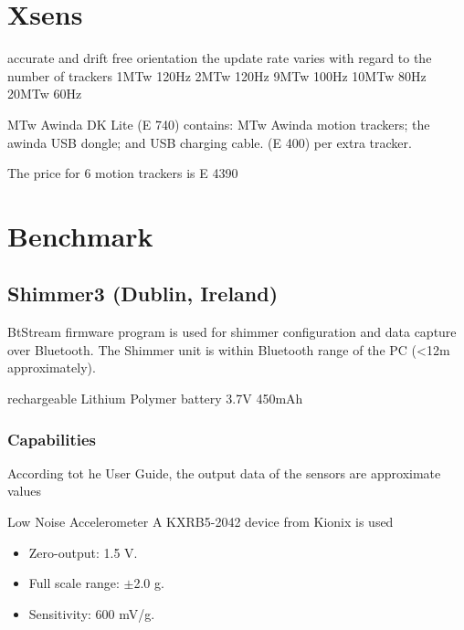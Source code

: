 \section{Xsens}


accurate and drift free orientation
the update rate varies with regard to the number of trackers
1MTw 120Hz
2MTw 120Hz
9MTw 100Hz
10MTw 80Hz
20MTw 60Hz

MTw Awinda DK Lite (E 740) contains:
MTw Awinda motion trackers; the awinda USB dongle; and USB charging cable.
(E 400) per extra tracker.

The price for 6 motion trackers is E 4390






\section*{Benchmark}

\subsection*{Shimmer3 (Dublin, Ireland)}


BtStream firmware program is used for shimmer configuration
and data capture over Bluetooth.
The Shimmer unit is within Bluetooth range of the PC (<12m approximately).

rechargeable Lithium Polymer battery 3.7V 450mAh

\subsubsection*{Capabilities}
According tot he User Guide, the output data of the sensors are
approximate values

Low Noise Accelerometer
A KXRB5-2042 device
from Kionix is used

\begin{itemize}
  \item Zero-output: 1.5 V.
  \item Full scale range: $\pm$2.0 g.
  \item Sensitivity: 600 mV/g.
\end{itemize}

